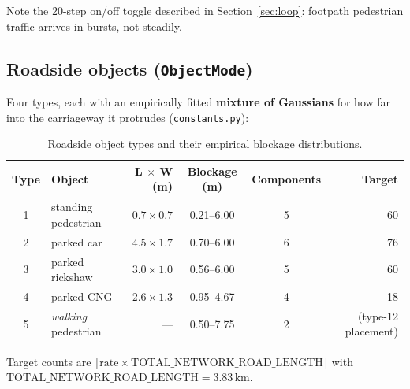 \documentclass[11pt, a4paper]{article}
\newcommand{\code}[1]{\texttt{#1}}
\begin{document}
Note the 20-step on/off toggle described in Section~\ref{sec:loop}: footpath
pedestrian traffic arrives in bursts, not steadily.

\subsection{Roadside objects (\code{ObjectMode})}

Four types, each with an empirically fitted \textbf{mixture of Gaussians} for how
far into the carriageway it protrudes (\code{constants.py}):

\begin{table}[h!]
\centering
\begin{tabular}{c l r c c r}
\toprule
\textbf{Type} & \textbf{Object} & \textbf{L $\times$ W (m)} & \textbf{Blockage (m)} & \textbf{Components} & \textbf{Target} \\
\midrule
1 & standing pedestrian & $0.7 \times 0.7$ & 0.21--6.00 & 5 & 60 \\
2 & parked car          & $4.5 \times 1.7$ & 0.70--6.00 & 6 & 76 \\
3 & parked rickshaw     & $3.0 \times 1.0$ & 0.56--6.00 & 5 & 60 \\
4 & parked CNG          & $2.6 \times 1.3$ & 0.95--4.67 & 4 & 18 \\
5 & \emph{walking} pedestrian & --- & 0.50--7.75 & 2 & (type-12 placement) \\
\bottomrule
\end{tabular}
\caption{Roadside object types and their empirical blockage distributions.}
\end{table}

Target counts are
$\lceil \text{rate} \times \text{TOTAL\_NETWORK\_ROAD\_LENGTH} \rceil$ with
$\text{TOTAL\_NETWORK\_ROAD\_LENGTH} = 3.83$\,km.
\end{document}
